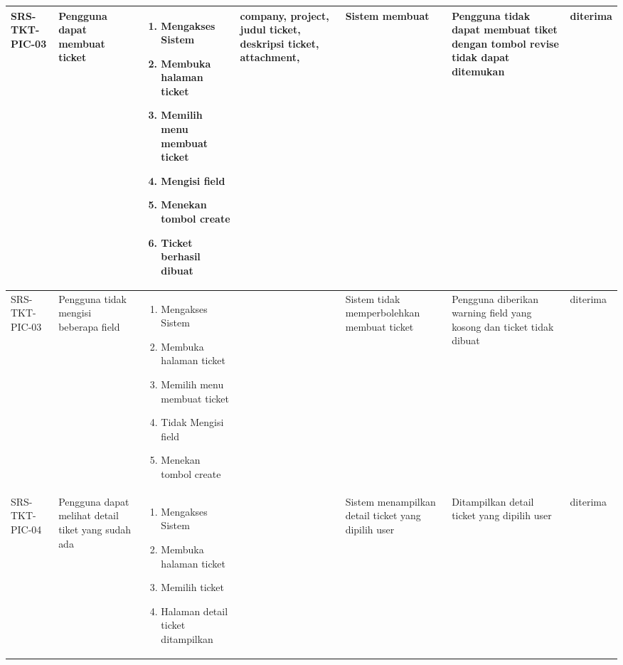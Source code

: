 \documentclass[12pt]{article}
\begin{document}
\begin{enumerate}[label=\textbf{5.\arabic*.}]
\begin{enumerate}[label=\textbf{5.2.\arabic*.}]
\begin{landscape}
\begin{longtable}{ |l|p{}|p{}|p{}|p{}|p{}|l| }
                \hline
                SRS-TKT-PIC-03 & Pengguna dapat membuat ticket & 
                \begin{enumerate}[label=\arabic*.] 
                    \item Mengakses Sistem
                    \item Membuka halaman ticket
                    \item Memilih menu membuat ticket
                    \item Mengisi field
                    \item Menekan tombol create
                    \item Ticket berhasil dibuat
                \end{enumerate} 
                & company, project, judul ticket, deskripsi ticket, attachment, & Sistem membuat 
                & Pengguna tidak dapat membuat tiket dengan tombol revise tidak dapat ditemukan & diterima \\
                \hline
                SRS-TKT-PIC-03 & Pengguna tidak mengisi beberapa field & 
                \begin{enumerate}[label=\arabic*.] 
                    \item Mengakses Sistem
                    \item Membuka halaman ticket
                    \item Memilih menu membuat ticket
                    \item Tidak Mengisi field
                    \item Menekan tombol create
                \end{enumerate} 
                &  & Sistem tidak memperbolehkan membuat ticket 
                & Pengguna diberikan warning field yang kosong dan ticket tidak dibuat & diterima \\
                \hline
                SRS-TKT-PIC-04 & Pengguna dapat melihat detail tiket yang sudah ada &  
                \begin{enumerate}[label=\arabic*.] 
                    \item Mengakses Sistem
                    \item Membuka halaman ticket
                    \item Memilih ticket
                    \item Halaman detail ticket ditampilkan
                \end{enumerate} 
                &  & Sistem menampilkan detail ticket yang dipilih user & Ditampilkan detail ticket yang dipilih user & diterima \\

\end{longtable}
\end{landscape}
\end{enumerate}
\end{enumerate}
\end{document}
